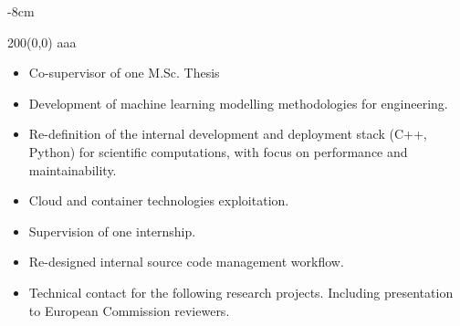 \documentclass[10pt,a4paper]{altacv}
\begin{document}


\begin{adjustwidth}{}{-8cm}
\makecvheader
\end{adjustwidth}

\vspace{0.5cm}

\begin{textblock}{200}(0,0)
  \centering
	aaa
  \vspace{38mm}
\end{textblock}




\divider

\smallskip
\begin{itemize}
\item Co-supervisor of one M.Sc. Thesis
\end{itemize}


\begin{itemize}
\item Development of machine learning modelling methodologies for engineering.
\item Re-definition of the internal development and deployment stack (C++, Python) for scientific computations, with focus on performance and maintainability.
\item Cloud and container technologies exploitation.
\item Supervision of one internship.
\item Re-designed internal source code management workflow.
\item Technical contact for the following research projects. Including presentation to European Commission reviewers.
\end{itemize}
\end{document}
